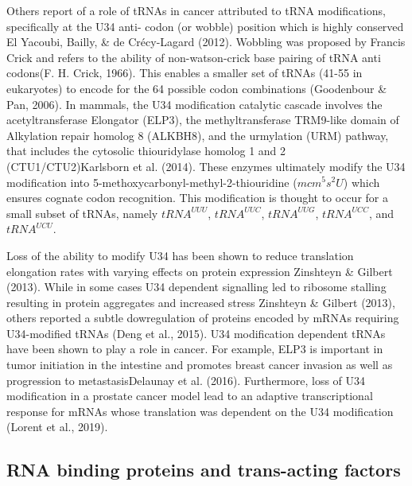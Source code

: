 \documentclass[
  12pt,
  openany]{book}
\begin{document}
Others report of a role of tRNAs in cancer attributed to tRNA modifications, specifically at the U34 anti- codon (or wobble) position which is highly conserved El Yacoubi, Bailly, \& de Crécy-Lagard (2012). Wobbling was proposed by Francis Crick and refers to the ability of non-watson-crick base pairing of tRNA anti codons(F. H. Crick, 1966). This enables a smaller set of tRNAs (41-55 in eukaryotes) to encode for the 64 possible codon combinations (Goodenbour \& Pan, 2006). In mammals, the U34 modification catalytic cascade involves the acetyltransferase Elongator (ELP3), the methyltransferase TRM9-like domain of Alkylation repair homolog 8 (ALKBH8), and the urmylation (URM) pathway, that includes the cytosolic thiouridylase homolog 1 and 2 (CTU1/CTU2)Karlsborn et al. (2014). These enzymes ultimately modify the U34 modification into 5-methoxycarbonyl-methyl-2-thiouridine (\(mcm^5s^2U\)) which ensures cognate codon recognition. This modification is thought to occur for a small subset of tRNAs, namely \(tRNA^{UUU}\), \(tRNA^{UUC}\), \(tRNA^{UUG}\), \(tRNA^{UCC}\), and \(tRNA^{UCU}\).

Loss of the ability to modify U34 has been shown to reduce translation elongation rates with varying effects on protein expression Zinshteyn \& Gilbert (2013). While in some cases U34 dependent signalling led to ribosome stalling resulting in protein aggregates and increased stress Zinshteyn \& Gilbert (2013), others reported a subtle dowregulation of proteins encoded by mRNAs requiring U34-modified tRNAs (Deng et al., 2015). U34 modification dependent tRNAs have been shown to play a role in cancer. For example, ELP3 is important in tumor initiation in the intestine and promotes breast cancer invasion as well as progression to metastasisDelaunay et al. (2016). Furthermore, loss of U34 modification in a prostate cancer model lead to an adaptive transcriptional response for mRNAs whose translation was dependent on the U34 modification (Lorent et al., 2019).

\subsection{RNA binding proteins and trans-acting factors}
\end{document}
